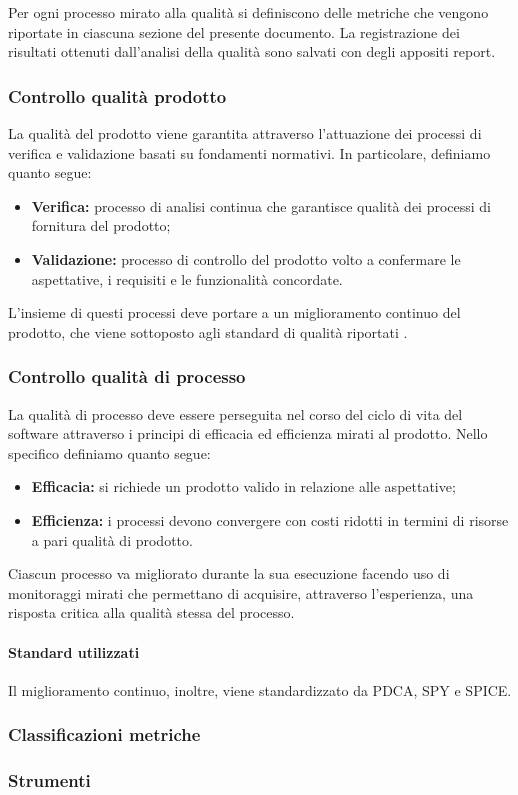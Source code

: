 	Per ogni processo mirato alla qualità si definiscono delle metriche che vengono riportate in ciascuna sezione del presente documento. 
	La registrazione dei risultati ottenuti dall'analisi della qualità sono salvati con degli appositi report.

	\subsubsection{Controllo qualità prodotto}

	La qualità del prodotto viene garantita attraverso l'attuazione dei processi di verifica e validazione basati su fondamenti normativi. In particolare, definiamo quanto segue:
	\begin{itemize}
		\item \textbf{Verifica:} processo di analisi continua che garantisce qualità dei processi di fornitura del prodotto;
		\item \textbf{Validazione:} processo di controllo del prodotto volto a confermare le aspettative, i requisiti e le funzionalità concordate.
	\end{itemize}

	L'insieme di questi processi deve portare a un miglioramento continuo del prodotto, che viene sottoposto agli standard di qualità riportati . 

	\subsubsection{Controllo qualità di processo}

	La qualità di processo deve essere perseguita nel corso del ciclo di vita del software attraverso i principi di efficacia ed efficienza mirati al prodotto. 
	Nello specifico definiamo quanto segue:
	\begin{itemize}
		\item \textbf{Efficacia:} si richiede un prodotto valido in relazione alle aspettative;
		\item \textbf{Efficienza:} i processi devono convergere con costi ridotti in termini di risorse a pari qualità di prodotto.
	\end{itemize}

	Ciascun processo va migliorato durante la sua esecuzione facendo uso di monitoraggi mirati che permettano di acquisire, attraverso l'esperienza, una risposta critica alla qualità stessa del processo. \\ 

	
	\paragraph{Standard utilizzati}


	Il miglioramento continuo, inoltre, viene standardizzato da PDCA, SPY e SPICE.  %


	\subsubsection{Classificazioni metriche} %
	
	\subsubsection{Strumenti} %
	
